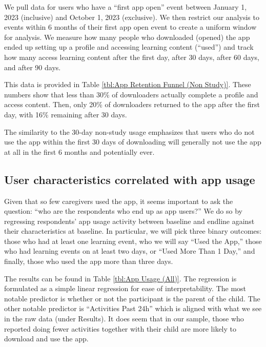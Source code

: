 We pull data for users who have a “first app open” event between January 1, 2023 (inclusive) and October 1, 2023 (exclusive). We then restrict our analysis to events within 6 months of their first app open event to create a uniform window for analysis. We measure how many people who downloaded (opened) the app ended up setting up a profile and accessing learning content (“used”) and track how many access learning content after the first day, after 30 days, after 60 days, and after 90 days.

This data is provided in Table {\ref{tbl:App Retention Funnel (Non Study)}}. These numbers show that less than 30\% of downloaders actually complete a profile and access content. Then, only 20\% of downloaders returned to the app after the first day, with 16\% remaining after 30 days.

The similarity to the 30-day non-study usage emphasizes that users who do not use the app within the first 30 days of downloading will generally not use the app at all in the first 6 months and potentially ever.




\subsection{User characteristics correlated with app usage}

Given that so few caregivers used the app, it seems important to ask the question: “who are the respondents who end up as app users?” We do so by regressing respondents’ app usage activity between baseline and endline against their characteristics at baseline. In particular, we will pick three binary outcomes: those who had at least one learning event, who we will say “Used the App,” those who had learning events on at least two days, or “Used More Than 1 Day,” and finally, those who used the app more than three days.

The results can be found in Table \ref{tbl:App Usage (All)}. The regression is formulated as a simple linear regression for ease of interpretability. The most notable predictor is whether or not the participant is the parent of the child. The other notable predictor is “Activities Past 24h” which is aligned with what we see in the raw data (under Results). It does seem that in our sample, those who reported doing fewer activities together with their child are more likely to download and use the app.

